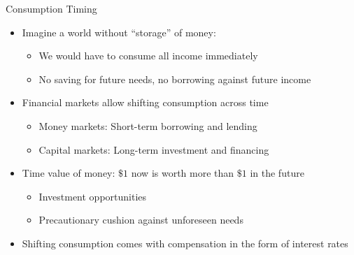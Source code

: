 \documentclass[10pt,handout]{beamer}
\begin{document}
\begin{frame}{Consumption Timing}
  \begin{itemize}[<+->]
    \item Imagine a world without ``storage'' of money: 
      \begin{itemize}
        \item We would have to consume all income immediately
        \item No saving for future needs, no borrowing against future income
      \end{itemize}
    \item Financial markets allow shifting consumption across time
      \begin{itemize}
        \item Money markets: Short-term borrowing and lending
        \item Capital markets: Long-term investment and financing
      \end{itemize}
    \item Time value of money: $\$1$ now is worth more than $\$1$ in the future
      \begin{itemize}
        \item Investment opportunities
        \item Precautionary cushion against unforeseen needs
      \end{itemize}
    \item Shifting consumption comes with compensation in the form of interest rates
  \end{itemize}
\end{frame}
\end{document}
